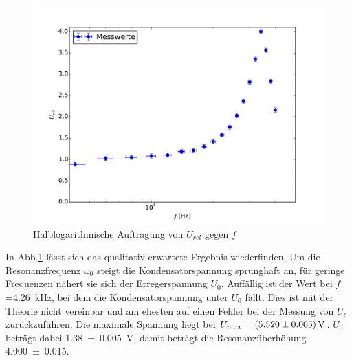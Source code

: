\begin{figure}
  \centering
  \includegraphics[width=\textwidth]{5c.pdf}
  \caption{Halblogarithmische Auftragung von $U_{rel}$ gegen $f$}
  \label{fig:5cergebnis}
\end{figure}
In Abb.\ref{fig:5cergebnis} lässt sich das qualitativ erwartete Ergebnis
wiederfinden. Um die Resonanzfrequenz $\omega_0$ steigt die Kondensatorspannung
sprunghaft an, für geringe Frequenzen nähert sie sich der Erregerspannung $U_0$.
Auffällig ist der Wert bei $f$=\SI{4.26}{\kilo\hertz},
bei dem die Kondensatorspannung unter
$U_0$ fällt. Dies ist mit der Theorie nicht vereinbar und am ehesten auf einen
Fehler bei der Messung von $U_c$ zurückzuführen. Die maximale Spannung liegt
bei $U_{max} = \SI{5.52 +- 0.005}{\volt}$. $U_0$ beträgt dabei \SI{1.38 +- 0.005}
{\volt}, damit beträgt die Resonanzüberhöhung \num{4.000 +- 0.015}.


